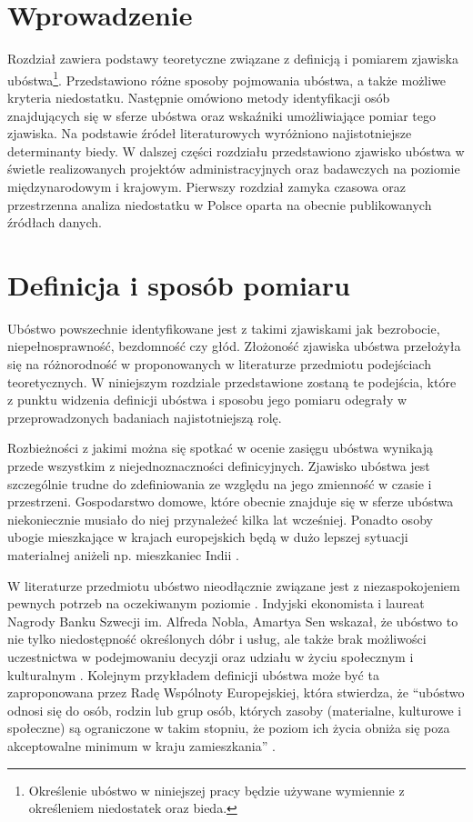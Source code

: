 \section{Wprowadzenie}

Rozdział zawiera podstawy teoretyczne związane z definicją i pomiarem zjawiska ubóstwa\footnote{Określenie ubóstwo w niniejszej pracy będzie używane wymiennie z określeniem niedostatek oraz bieda.}. Przedstawiono różne sposoby pojmowania ubóstwa, a także możliwe kryteria niedostatku. Następnie omówiono metody identyfikacji osób znajdujących się w sferze ubóstwa oraz wskaźniki umożliwiające pomiar tego zjawiska. Na podstawie źródeł literaturowych wyróżniono najistotniejsze determinanty biedy. W dalszej części rozdziału przedstawiono zjawisko ubóstwa w świetle realizowanych projektów administracyjnych oraz badawczych na poziomie międzynarodowym i krajowym. Pierwszy rozdział zamyka czasowa oraz przestrzenna analiza niedostatku w Polsce oparta na obecnie publikowanych źródłach danych.

\section{Definicja i sposób pomiaru}

Ubóstwo powszechnie identyfikowane jest z takimi zjawiskami jak bezrobocie, niepełnosprawność, bezdomność czy głód. Złożoność zjawiska ubóstwa przełożyła się na różnorodność w proponowanych w literaturze przedmiotu podejściach teoretycznych. W niniejszym rozdziale przedstawione zostaną te podejścia, które z punktu widzenia definicji ubóstwa i sposobu jego pomiaru odegrały w przeprowadzonych badaniach najistotniejszą rolę.

Rozbieżności z jakimi można się spotkać w ocenie zasięgu ubóstwa wynikają przede wszystkim z niejednoznaczności definicyjnych. Zjawisko ubóstwa jest szczególnie trudne do zdefiniowania ze względu na jego zmienność w czasie i przestrzeni. Gospodarstwo domowe, które obecnie znajduje się w sferze ubóstwa niekoniecznie musiało do niej przynależeć kilka lat wcześniej. Ponadto osoby ubogie mieszkające w krajach europejskich będą w dużo lepszej sytuacji materialnej aniżeli np. mieszkaniec Indii \citep{panek2011}.

W literaturze przedmiotu ubóstwo nieodłącznie związane jest z niezaspokojeniem pewnych potrzeb na oczekiwanym poziomie \citep{drewnowski1977}. Indyjski ekonomista i laureat Nagrody Banku Szwecji im. Alfreda Nobla, Amartya Sen wskazał, że ubóstwo to nie tylko niedostępność określonych dóbr i usług, ale także brak możliwości uczestnictwa w podejmowaniu decyzji oraz udziału w życiu społecznym i kulturalnym \citep{sen1992}. Kolejnym przykładem definicji ubóstwa może być ta zaproponowana przez Radę Wspólnoty Europejskiej, która stwierdza, że ``ubóstwo odnosi się do osób, rodzin lub grup osób, których zasoby (materialne, kulturowe i społeczne) są ograniczone w takim stopniu, że poziom ich życia obniża się poza akceptowalne minimum w kraju zamieszkania'' \citep{eec1985}.

